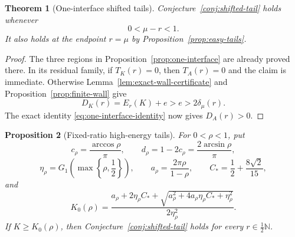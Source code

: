 \documentclass[11pt]{article}
\newtheorem{theorem}{Theorem}[section]
\newtheorem{proposition}[theorem]{Proposition}
\theoremstyle{remark}
\newcommand{\N}{\mathbb N}
\begin{document}
\begin{theorem}[One-interface shifted tails]
\label{thm:one-interface-complete}
Conjecture~\ref{conj:shifted-tail} holds whenever
\[
 0<\mu-r<1.
\]
It also holds at the endpoint $r=\mu$ by
Proposition~\ref{prop:easy-tails}.
\end{theorem}

\begin{proof}
The three regions in Proposition~\ref{prop:one-interface} are already
proved there.  In its residual family, if $T_K(r)=0$, then $T_A(r)=0$ and
the claim is immediate.  Otherwise Lemma~\ref{lem:exact-wall-certificate}
and Proposition~\ref{prop:finite-wall} give
\[
 D_K(r)=E_r(K)+e>e>2\delta_\mu(r).
\]
The exact identity \eqref{eq:one-interface-identity} now gives
$D_A(r)>0$.
\end{proof}

\begin{proposition}[Fixed-ratio high-energy tails]
\label{prop:fixed-rho-high-energy}
For $0<\rho<1$, put
\[
 c_\rho=\frac{\arccos\rho}{\pi},
 \qquad d_\rho=1-2c_\rho=\frac{2\arcsin\rho}{\pi},
\]
\[
 \eta_\rho=G_1\left(\max\left\{\rho,\frac12\right\}\right),
 \qquad
 a_\rho=\frac{2\pi\rho}{1-\rho},
 \qquad C_*=\frac12+\frac{8\sqrt2}{15},
\]
and
\begin{equation}
 K_0(\rho)=
 \frac{a_\rho+2\eta_\rho C_*
 +\sqrt{a_\rho^2+4a_\rho\eta_\rho C_*+\eta_\rho^2}}
 {2\eta_\rho^2}.
 \label{eq:fixed-rho-threshold}
\end{equation}
If $K\geq K_0(\rho)$, then
Conjecture~\ref{conj:shifted-tail} holds for every
$r\in\tfrac12\N$.
\end{proposition}
\end{document}
